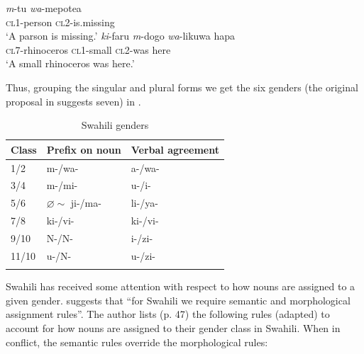 \begin{exe}
    \ex
    \begin{xlist}
        \ex \label{swahili-class-exe-cl1}
        \gll \textit{m}-tu \textit{wa}-mepotea\\ 
         \textsc{cl1}-person \textsc{cl2}-is.missing\\
        \glt `A parson is missing.'
        \ex \label{swahili-class-exe-cl2}
        \gll \textit{ki}-faru \textit{m}-dogo \textit{wa}-likuwa hapa\\
         \textsc{cl7}-rhinoceros \textsc{cl1}-small \textsc{cl2}-was here\\
        \glt `A small rhinoceros was here.'
    \end{xlist}
\end{exe}

Thus, grouping the singular and plural forms we get the six genders (the  original proposal in \textcite[47]{Corbett.1991} suggests seven) in .

\begin{table}
  \centering
  \begin{tabular}{lll}
    \lsptoprule
    Class & Prefix on noun             & Verbal agreement \\
    \midrule
    1/2   & m-/wa-                     & a-/wa-           \\
    3/4   & m-/mi-                     & u-/i-            \\
    5/6   & $\varnothing \sim$ ji-/ma- & li-/ya-          \\
    7/8   & ki-/vi-                    & ki-/vi-          \\
    9/10  & N-/N-                      & i-/zi-           \\
    11/10 & u-/N-                      & u-/zi-           \\
    \lspbottomrule
  \end{tabular}
  \caption{Swahili genders}\label{tab:genders-swahili}
\end{table}

Swahili has received some attention with respect to how nouns are assigned to a given gender. \textcite[47]{Corbett.1991} suggests that ``for Swahili we require semantic and morphological assignment rules''. The author lists (p. 47) the following rules (adapted) to account for how nouns are assigned to their gender class in Swahili. When in conflict, the semantic rules override the morphological rules:\\

